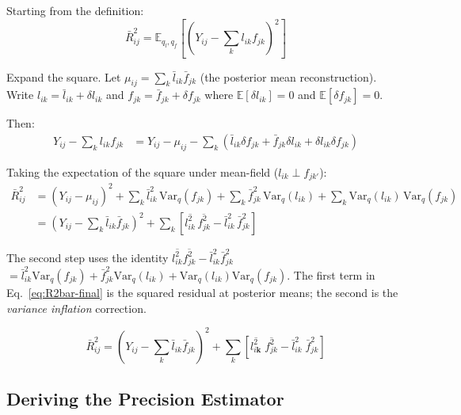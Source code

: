 \documentclass[11pt]{article}
\newcommand{\lbar}[2]{\bar{l}_{#1#2}}
\newcommand{\fbar}[2]{\bar{f}_{#1#2}}
\newcommand{\lsec}[2]{\overline{l^2_{#1#2}}}
\newcommand{\fsec}[2]{\overline{f^2_{#1#2}}}
\begin{document}
\begin{derivbox}
Starting from the definition:
\begin{equation}
  \bar{R}^2_{ij} = \mathbb{E}_{q_l,q_f}\!\left[
    \left(Y_{ij} - \sum_k l_{ik}f_{jk}\right)^{\!2}
  \right] \label{eq:R2bar-def}
\end{equation}

Expand the square. Let $\mu_{ij} = \sum_k\lbar{i}{k}\fbar{j}{k}$ (the posterior
mean reconstruction). Write $l_{ik} = \lbar{i}{k} + \delta l_{ik}$ and
$f_{jk} = \fbar{j}{k} + \delta f_{jk}$ where $\mathbb{E}[\delta l_{ik}] = 0$
and $\mathbb{E}[\delta f_{jk}] = 0$.

Then:
\begin{align}
  Y_{ij} - \sum_k l_{ik}f_{jk}
  &= Y_{ij} - \mu_{ij}
    - \sum_k\left(\lbar{i}{k}\delta f_{jk} + \fbar{j}{k}\delta l_{ik}
                  + \delta l_{ik}\delta f_{jk}\right)
  \label{eq:resid-expand}
\end{align}

Taking the expectation of the square under mean-field ($l_{ik}\perp f_{jk'}$):
\begin{align}
  \bar{R}^2_{ij}
  &= \left(Y_{ij} - \mu_{ij}\right)^2
    + \sum_k\lbar{i}{k}^2\,\mathrm{Var}_q(f_{jk})
    + \sum_k\fbar{j}{k}^2\,\mathrm{Var}_q(l_{ik})
    + \sum_k\mathrm{Var}_q(l_{ik})\,\mathrm{Var}_q(f_{jk})
  \label{eq:R2bar-expand}\\
  &= \left(Y_{ij} - \sum_k\lbar{i}{k}\fbar{j}{k}\right)^{\!2}
    + \sum_k\!\left[\lsec{i}{k}\,\fsec{j}{k} - \lbar{i}{k}^2\,\fbar{j}{k}^2\right]
  \label{eq:R2bar-final}
\end{align}

The second step uses the identity
$\lsec{i}{k}\fsec{j}{k} - \lbar{i}{k}^2\fbar{j}{k}^2$
$= \lbar{i}{k}^2\mathrm{Var}_q(f_{jk}) + \fbar{j}{k}^2\mathrm{Var}_q(l_{ik})
   + \mathrm{Var}_q(l_{ik})\mathrm{Var}_q(f_{jk})$.
The first term in Eq.~\eqref{eq:R2bar-final} is the squared residual at
posterior means; the second is the \emph{variance inflation} correction.
\end{derivbox}

\begin{equation}\label{eq:expected-R2}
  \bar{R}^2_{ij}
  = \left(Y_{ij} - \sum_k \lbar{i}{k}\fbar{j}{k}\right)^{\!2}
    + \sum_k\!\left[\lsec{i\mathbf{k}}{}\;\fsec{j}{k}
               - \lbar{i}{k}^2\;\fbar{j}{k}^2\right]
\end{equation}

\subsection{Deriving the Precision Estimator}
\end{document}
